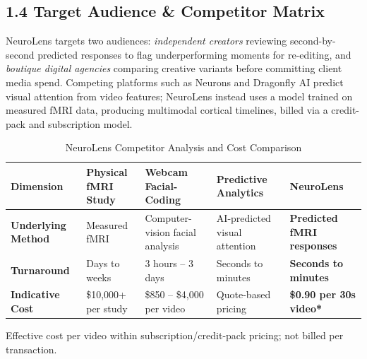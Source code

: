 \documentclass[10pt,a4paper]{article}
\begin{document}
\subsection*{\textsf{1.4 Target Audience \& Competitor Matrix}}
NeuroLens targets two audiences: \textit{independent creators} reviewing second-by-second predicted responses to flag underperforming moments for re-editing, and \textit{boutique digital agencies} comparing creative variants before committing client media spend. Competing platforms such as Neurons and Dragonfly AI predict visual attention from video features; NeuroLens instead uses a model trained on measured fMRI data, producing multimodal cortical timelines, billed via a credit-pack and subscription model.

\begin{table}[htbp]
    \centering
    \caption{NeuroLens Competitor Analysis and Cost Comparison}
    \begin{tabularx}{\textwidth}{|X|X|X|X|X|}
    \hline
    \rowcolor{black!5}
    \textbf{Dimension} & \makecell[l]{\textbf{Physical fMRI} \\ \textbf{Study}} & \makecell[l]{\textbf{Webcam Facial-} \\ \textbf{Coding}} & \makecell[l]{\textbf{Predictive} \\ \textbf{Analytics}} & \textbf{NeuroLens} \\
    \hline
    \textbf{Underlying Method} & Measured fMRI & Computer-vision facial analysis & AI-predicted visual attention & \textbf{Predicted fMRI responses} \\
    \hline
    \textbf{Turnaround} & Days to weeks & 3 hours -- 3 days & Seconds to minutes & \textbf{Seconds to minutes} \\
    \hline
    \textbf{Indicative Cost} & \$10,000+ per study & \$850 -- \$4,000 per video & Quote-based pricing & \textbf{\$0.90 per 30s video*} \\
    \hline
    \end{tabularx}
    \vspace{4pt}
    {\raggedright \footnotesize *Effective cost per video within subscription/credit-pack pricing; not billed per transaction.\par}
\end{table}

\vspace{-6mm}
\end{document}
